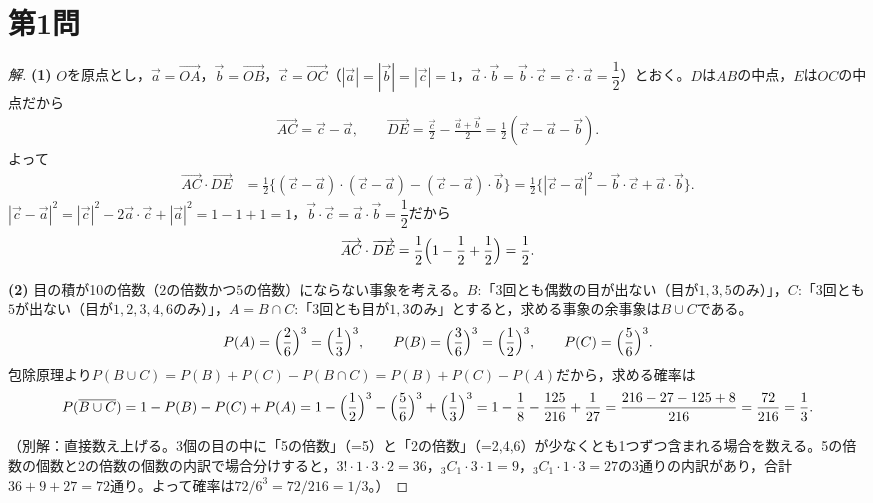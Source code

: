 \documentclass[../main.tex]{subfiles}
\begin{document}
\section*{第1問}

\begin{proof}[解]
  \textbf{(1)} $O$を原点とし，$\vec a=\overrightarrow{OA}$，$\vec b=\overrightarrow{OB}$，$\vec c=\overrightarrow{OC}$（$|\vec a|=|\vec b|=|\vec c|=1$，$\vec a\cdot\vec b=\vec b\cdot\vec c=\vec c\cdot\vec a=\dfrac12$）とおく。$D$は$AB$の中点，$E$は$OC$の中点だから
  \begin{align*}
    \overrightarrow{AC}=\vec c-\vec a,\qquad\overrightarrow{DE}=\frac{\vec c}2-\frac{\vec a+\vec b}2=\frac12(\vec c-\vec a-\vec b).
  \end{align*}
  よって
  \begin{align*}
    \overrightarrow{AC}\cdot\overrightarrow{DE}&=\frac12\bigl\{(\vec c-\vec a)\cdot(\vec c-\vec a)-(\vec c-\vec a)\cdot\vec b\bigr\}=\frac12\bigl\{|\vec c-\vec a|^2-\vec b\cdot\vec c+\vec a\cdot\vec b\bigr\}.
  \end{align*}
  $|\vec c-\vec a|^2=|\vec c|^2-2\vec a\cdot\vec c+|\vec a|^2=1-1+1=1$，$\vec b\cdot\vec c=\vec a\cdot\vec b=\dfrac12$だから
  \begin{align*}
    \overrightarrow{AC}\cdot\overrightarrow{DE}=\frac12\Bigl(1-\frac12+\frac12\Bigr)=\frac12.
  \end{align*}

  \textbf{(2)} 目の積が10の倍数（$2$の倍数かつ$5$の倍数）にならない事象を考える。$B$:「3回とも偶数の目が出ない（目が$1,3,5$のみ）」，$C$:「3回とも$5$が出ない（目が$1,2,3,4,6$のみ）」，$A=B\cap C$:「3回とも目が$1,3$のみ」とすると，求める事象の余事象は$B\cup C$である。
  \begin{align*}
    P(A)=\Bigl(\frac26\Bigr)^3=\Bigl(\frac13\Bigr)^3,\qquad P(B)=\Bigl(\frac36\Bigr)^3=\Bigl(\frac12\Bigr)^3,\qquad P(C)=\Bigl(\frac56\Bigr)^3.
  \end{align*}
  包除原理より$P(B\cup C)=P(B)+P(C)-P(B\cap C)=P(B)+P(C)-P(A)$だから，求める確率は
  \begin{align*}
    P(\overline{B\cup C})=1-P(B)-P(C)+P(A)=1-\Bigl(\frac12\Bigr)^3-\Bigl(\frac56\Bigr)^3+\Bigl(\frac13\Bigr)^3=1-\frac18-\frac{125}{216}+\frac1{27}=\frac{216-27-125+8}{216}=\frac{72}{216}=\frac13.
  \end{align*}

  （別解：直接数え上げる。3個の目の中に「5の倍数」（=5）と「2の倍数」（=2,4,6）が少なくとも1つずつ含まれる場合を数える。5の倍数の個数と2の倍数の個数の内訳で場合分けすると，$3!\cdot1\cdot3\cdot2=36$，${}_3C_1\cdot3\cdot1=9$，${}_3C_1\cdot1\cdot3=27$の3通りの内訳があり，合計$36+9+27=72$通り。よって確率は$72/6^3=72/216=1/3$。）
\end{proof}
\end{document}
